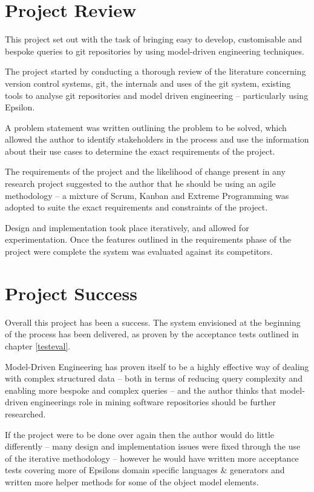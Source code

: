 \documentclass[11pt]{book}
\begin{document}
\section{Project Review}
This project set out with the task of bringing easy to develop, customisable and bespoke queries to git repositories by using model-driven engineering techniques. 

The project started by conducting a thorough review of the literature concerning version control systems, git, the internals and uses of the git system, existing tools to analyse git repositories and model driven engineering -- particularly using Epsilon.

A problem statement was written outlining the problem to be solved, which allowed the author to identify stakeholders in the process and use the information about their use cases to determine the exact requirements of the project.

The requirements of the project and the likelihood of change present in any research project suggested to the author that he should be using an agile methodology -- a mixture of Scrum, Kanban and Extreme Programming was adopted to suite the exact requirements and constraints of the project.

Design and implementation took place iteratively, and allowed for experimentation. Once the features outlined in the requirements phase of the project were complete the system was evaluated against its competitors.

\section{Project Success}
Overall this project has been a success. The system envisioned at the beginning of the process has been delivered, as proven by the acceptance tests outlined in chapter \ref{testeval}.

Model-Driven Engineering has proven itself to be a highly effective way of dealing with complex structured data -- both in terms of reducing query complexity and enabling more bespoke and complex queries -- and the author thinks that model-driven engineerings role in mining software repositories should be further researched.

If the project were to be done over again then the author would do little differently -- many design and implementation issues were fixed through the use of the iterative methodology -- however he would have written more acceptance tests covering more of Epsilons domain specific languages \& generators and written more helper methods for some of the object model elements.
\end{document}
